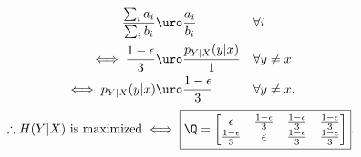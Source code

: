 \documentclass[
  coursecode={MTHE 474},
  assignmentname={Homework \homeworknumber},
  studentnumber=20053722,
  name={Bryan Hoang},
  draft,
]{
  ltxanswer%
}
\begin{document}
\begin{questions}
\begin{parts}
\begin{solution}
\begin{align*}
          \frac{\sum_{i} a_{i}}{\sum_{i} b_{i}} &\uro \frac{a_{i}}{b_{i}}                                                                                     & &\forall i        \\
          \iff \frac{1-\epsilon}{3}             &\uro \frac{p_{Y|X}(y|x)}{1}                                                                                  & &\forall y \ne x  \\
          \iff p_{Y|X}(y|x)                     &\uro \frac{1-\epsilon}{3}                                                                                    & &\forall y \ne x.
        \end{align*}
        \begin{equation*}
          \therefore\text{\(H(Y|X)\) is maximized} \iff \boxed{\Q = \begin{bmatrix}
              \epsilon             & \frac{1-\epsilon}{3} & \frac{1-\epsilon}{3} & \frac{1-\epsilon}{3} \\
              \frac{1-\epsilon}{3} & \epsilon             & \frac{1-\epsilon}{3} & \frac{1-\epsilon}{3}
            \end{bmatrix}}.
        \end{equation*}
      \end{solution}


\end{parts}
\end{questions}
\end{document}
